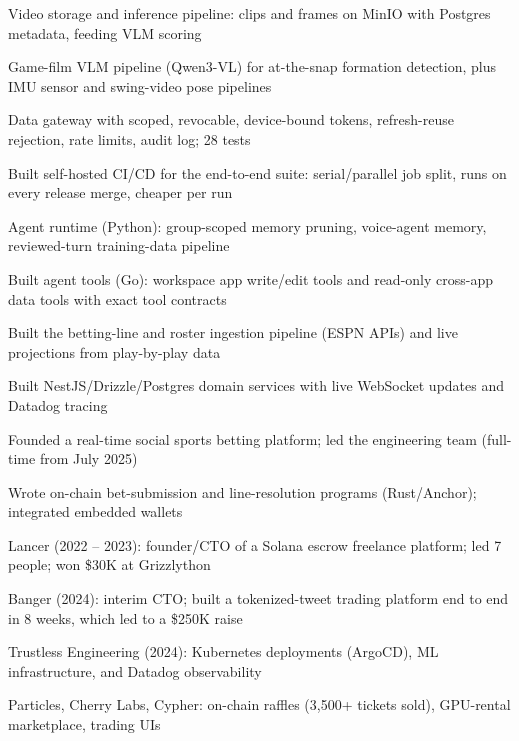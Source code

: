 \documentclass[print]{jack-resume}
\begin{document}
\begin{tightemize}
    \item Video storage and inference pipeline: clips and frames on MinIO with Postgres metadata, feeding VLM scoring
    \item Game-film VLM pipeline (Qwen3-VL) for at-the-snap formation detection, plus IMU sensor and swing-video pose pipelines
    \item Data gateway with scoped, revocable, device-bound tokens, refresh-reuse rejection, rate limits, audit log; 28 tests
    \item Built self-hosted CI/CD for the end-to-end suite: serial/parallel job split, runs on every release merge, cheaper per run
    \item Agent runtime (Python): group-scoped memory pruning, voice-agent memory, reviewed-turn training-data pipeline
    \item Built agent tools (Go): workspace app write/edit tools and read-only cross-app data tools with exact tool contracts
\end{tightemize}
\sectionsep

\begin{tightemize}
    \item Built the betting-line and roster ingestion pipeline (ESPN APIs) and live projections from play-by-play data
    \item Built NestJS/Drizzle/Postgres domain services with live WebSocket updates and Datadog tracing
    \item Founded a real-time social sports betting platform; led the engineering team (full-time from July 2025)
    \item Wrote on-chain bet-submission and line-resolution programs (Rust/Anchor); integrated embedded wallets
\end{tightemize}
\sectionsep

\begin{tightemize}
    \item Lancer (2022 – 2023): founder/CTO of a Solana escrow freelance platform; led 7 people; won \$30K at Grizzlython
    \item Banger (2024): interim CTO; built a tokenized-tweet trading platform end to end in 8 weeks, which led to a \$250K raise
    \item Trustless Engineering (2024): Kubernetes deployments (ArgoCD), ML infrastructure, and Datadog observability
    \item Particles, Cherry Labs, Cypher: on-chain raffles (3,500+ tickets sold), GPU-rental marketplace, trading UIs
\end{tightemize}
\sectionsep
\end{document}
